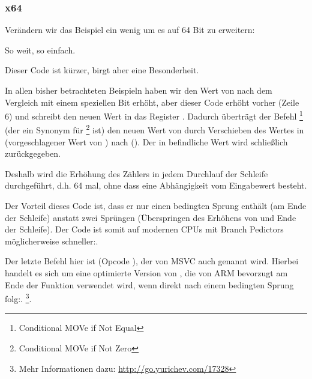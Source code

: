 \subsubsection{x64}
\label{subsec:popcnt}
Verändern wir das Beispiel ein wenig um es auf 64 Bit zu erweitern:




So weit, so einfach.





Dieser Code ist kürzer, birgt aber eine Besonderheit.

In allen bisher betrachteten Beispieln haben wir den Wert von  nach dem
Vergleich mit einem speziellen Bit erhöht, aber dieser Code erhöht  vorher
(Zeile 6) und schreibt den neuen Wert in das Register \EDX.
Dadurch überträgt der Befehl \CMOVNE\footnote{Conditional MOVe if Not Equal}
(der ein Synonym für \CMOVNZ\footnote{Conditional MOVe if Not Zero} ist) den
neuen Wert von  durch Verschieben des Wertes in \EDX (vorgeschlagener
Wert von ) nach \EAX (). Der in \EAX befindliche
Wert wird schließlich zurückgegeben.

Deshalb wird die Erhöhung des Zählers in jedem Durchlauf der Schleife
durchgeführt, d.h. 64 mal, ohne dass eine Abhängigkeit vom Eingabewert
besteht.

Der Vorteil dieses Code ist, dass er nur einen bedingten Sprung enthält (am
Ende der Schleife) anstatt zwei Sprüngen (Überspringen des Erhöhens von 
und Ende der Schleife). 
Der Code ist somit auf modernen CPUs mit Branch Pedictors möglicherweise
schneller:.

\label{FATRET}
Der letzte Befehl hier ist  (Opcode ), der von MSVC auch
 genannt wird.
Hierbei handelt es sich um eine optimierte Version von \RET, die von ARM
bevorzugt am Ende der Funktion verwendet wird, wenn \RET direkt nach einem
bedingten Sprung folg:.
\footnote{Mehr Informationen dazu: \url{http://go.yurichev.com/17328}}.

